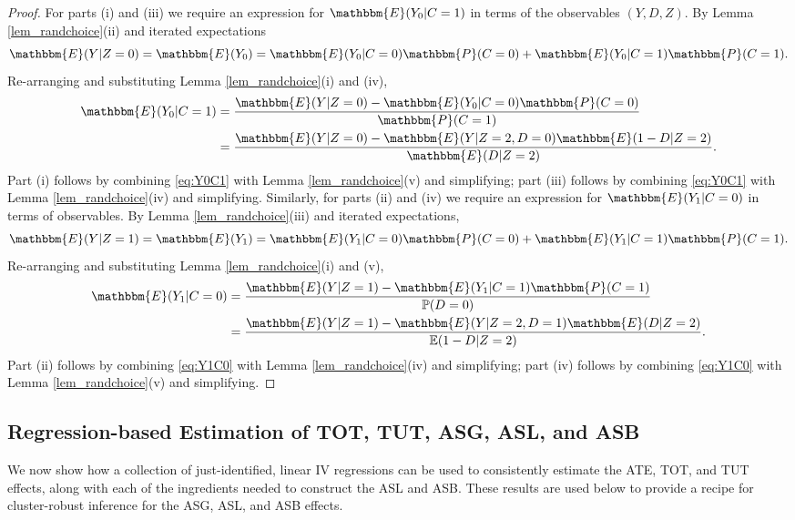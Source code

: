 \begin{proof}
For parts (i) and (iii) we require an expression for $\mathbbm{E}(Y_0|C=1)$ in terms of the observables $(Y, D, Z)$.
By Lemma \ref{lem_randchoice}(ii) and iterated expectations 
\[
\mathbbm{E}(Y|Z=0) = \mathbbm{E}(Y_0) = \mathbbm{E}(Y_0|C=0) \mathbbm{P}(C=0) + \mathbbm{E}(Y_0|C=1) \mathbbm{P}(C=1).
\]
Re-arranging and substituting Lemma \ref{lem_randchoice}(i) and (iv),
\begin{align}
\mathbbm{E}(Y_0|C=1)  &= \frac{\mathbbm{E}(Y|Z=0) - \mathbbm{E}(Y_0|C=0) \mathbbm{P}(C=0)}{\mathbbm{P}(C=1)}\nonumber\\ 
&=  \frac{\mathbbm{E}(Y|Z=0) - \mathbbm{E}(Y|Z=2,D=0) \mathbbm{E}(1 - D|Z=2)}{\mathbbm{E}(D|Z=2)}.
\label{eq:Y0C1}
\end{align}
Part (i) follows by combining \eqref{eq:Y0C1} with Lemma \ref{lem_randchoice}(v) and simplifying; part (iii) follows by combining \eqref{eq:Y0C1} with Lemma \ref{lem_randchoice}(iv) and simplifying.
Similarly, for parts (ii) and (iv) we require an expression for $\mathbbm{E}(Y_1|C=0)$ in terms of observables.
By Lemma \ref{lem_randchoice}(iii) and iterated expectations,
\[
\mathbbm{E}(Y|Z=1) = \mathbbm{E}(Y_1) = \mathbbm{E}(Y_1|C=0)\mathbbm{P}(C=0) + \mathbbm{E}(Y_1|C=1) \mathbbm{P}(C=1).
\]
Re-arranging and substituting Lemma \ref{lem_randchoice}(i) and (v),
\begin{align}
\mathbbm{E}(Y_1|C=0) 
&= \frac{\mathbbm{E}(Y|Z=1) - \mathbbm{E}(Y_1|C=1)\mathbbm{P}(C=1)}{\mathbb{P}(D=0)} \nonumber\\
&=\frac{\mathbbm{E}(Y|Z=1) - \mathbbm{E}(Y|Z=2,D=1)\mathbbm{E}(D|Z=2)}{\mathbb{E}(1-D|Z=2)}.
\label{eq:Y1C0}
\end{align}
Part (ii) follows by combining \eqref{eq:Y1C0} with Lemma \ref{lem_randchoice}(iv) and simplifying; part (iv) follows by combining \eqref{eq:Y1C0} with Lemma \ref{lem_randchoice}(v) and simplifying.
\end{proof}

\subsection{Regression-based Estimation of TOT, TUT, ASG, ASL, and ASB}

We now show how a collection of just-identified, linear IV regressions can be used to consistently estimate the ATE, TOT, and TUT effects, along with each of the ingredients needed to construct the ASL and ASB. 
These results are used below to provide a recipe for cluster-robust inference for the ASG, ASL, and ASB effects.

